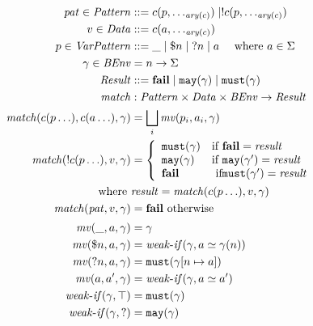 \documentclass[preprint,onecolumn,9pt]{sigplanconf} %
\begin{document}
\begin{figure}
  \begin{align*}
    \mpat \in \Pattern &::= \mconstructor(\mvpat, \ldots_{\ary(\mconstructor)}) \alt \snonevent{\mconstructor(\mvpat, \ldots_{\ary(\mconstructor)})}
\\
    \mdata \in \Qualified &::= \mconstructor(\matom, \ldots_{\ary(\mconstructor)})
\\
    \mvpat \in \VPat &::= \swc \alt \sref{\mname} \alt \sbind{\mname} \alt \matom
      \quad\text{ where } \matom \in \Sigma
\\
    \mbindenv \in \BindEnv &= \mname \to \Sigma
\\
    \MatchResult &::= \mfail \alt \smay{\mbindenv} \alt \smust{\mbindenv}
\\
    \match &: \Pattern \times \Qualified \times \BindEnv \to \MatchResult
\\
    \match(\mconstructor(\mvpat \ldots), \mconstructor(\matom \ldots), \mbindenv) &=
      \bigsqcup\limits_i{\matchv(\mvpat_i, \matom_i, \mbindenv)}
\\
    \match(\snonevent{\mconstructor(\mvpat \ldots)}, \mdata, \mbindenv) &=
      \left\{\begin{array}{ll}
               \smust{\mbindenv} & \text{if } \mfail = \mres \\
               \smay{\mbindenv} & \text{if } \smay{\mbindenv'} = \mres \\
               \mfail & \text{ if} \smust{\mbindenv'} = \mres \\
             \end{array}\right.
    \\ \text{where }& \mres = \match(\mconstructor(\mvpat \ldots), \mdata, \mbindenv)
\\
    \match(\mpat, \mdata, \mbindenv) &= \mfail \text{ otherwise}
\\[2pt]
    \matchv(\swc, \matom, \mbindenv) &= \mbindenv
\\
    \matchv(\sref{\mname}, \matom, \mbindenv) &= \weakif(\mbindenv, \matom \simeq \mbindenv(\mname))
\\
    \matchv(\sbind{\mname}, \matom, \mbindenv) &= \smust{\mbindenv[\mname \mapsto \matom]}
\\
    \matchv(\matom, \matom', \mbindenv) &= \weakif(\mbindenv, \matom \simeq \matom')
\\
    \weakif(\mbindenv, \top) &= \smust{\mbindenv}
\\
    \weakif(\mbindenv, ?) &= \smay{\mbindenv}
\\

\end{align*}
\end{figure}
\end{document}
